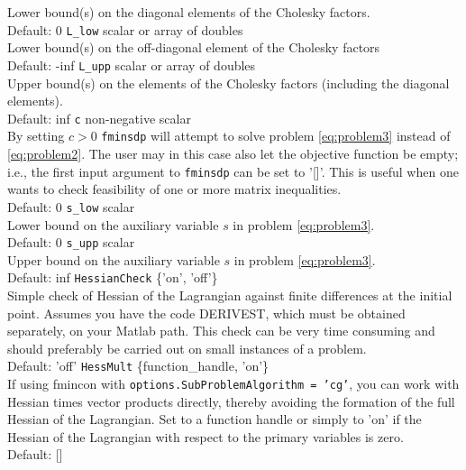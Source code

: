\documentclass{article}
\begin{document}
Lower bound(s) on the diagonal elements of the Cholesky factors. \\
Default: 0
\vskip 2mm
\noindent \texttt{L\_low} \hskip 2.75cm   scalar or array of doubles \\
Lower bound(s) on the off-diagonal element of the Cholesky factors \\
Default: -inf
\vskip 2mm
\noindent 
\texttt{L\_upp} \hskip 2.75cm  scalar or array of doubles \\
Upper bound(s) on the elements of the Cholesky factors (including the diagonal elements).\\
Default: inf
\vskip 2mm
\noindent 
\texttt{c} \hskip 3.47cm  non-negative scalar    \\
By setting $c>0$ \texttt{fminsdp} will attempt to solve problem \eqref{eq:problem3} instead of 
\eqref{eq:problem2}. The user may in this case also let the objective function be empty; i.e., the first input argument to \texttt{fminsdp} can be set to '[]'. This is useful when one wants to check feasibility of one or more matrix inequalities. \\
Default: 0
\vskip 2mm
\noindent
\texttt{s\_low}   \hskip 2.8cm        scalar      \\
Lower bound on the auxiliary variable $s$ in problem \eqref{eq:problem3}.\\
Default: 0
\vskip 2mm
\noindent
\texttt{s\_upp}   \hskip 2.8cm        scalar      \\
Upper bound on the auxiliary variable $s$ in problem \eqref{eq:problem3}.\\
Default: inf
\vskip 2mm
\noindent
\texttt{HessianCheck} \hskip 1.4cm   \{'on', 'off'\} \\      
Simple check of Hessian of the Lagrangian against finite differences at the initial point. 
Assumes you have the code DERIVEST, which must be obtained separately, on your Matlab path. 
This check can be very time consuming and should preferably be carried out on small instances of 
a problem.\\
Default: 'off'
\vskip 2mm
\noindent
\texttt{HessMult} \hskip 2cm   \{function\_handle, 'on'\} \\
If using fmincon with \texttt{options.SubProblemAlgorithm = 'cg'}, you can work with Hessian 
times vector products directly, thereby avoiding the formation of the full Hessian of
the Lagrangian. Set to a function handle or simply to 'on' if the Hessian of
the Lagrangian with respect to the primary variables is zero. \\
Default: []
\vskip 2mm
\end{document}
